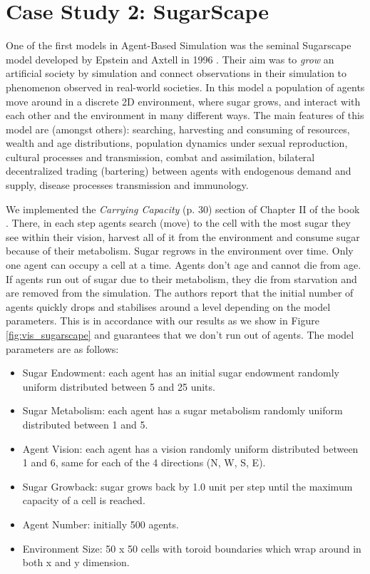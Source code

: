 \section{Case Study 2: SugarScape} %
\label{sec:cs_sugarscape}

One of the first models in Agent-Based Simulation was the seminal Sugarscape model developed by Epstein and Axtell in 1996 \cite{epstein_growing_1996}. Their aim was to \textit{grow} an artificial society by simulation and connect observations in their simulation to phenomenon observed in real-world societies. In this model a population of agents move around in a discrete 2D environment, where sugar grows, and interact with each other and the environment in many different ways. The main features of this model are (amongst others): searching, harvesting and consuming of resources, wealth and age distributions, population dynamics under sexual reproduction, cultural processes and transmission, combat and assimilation, bilateral decentralized trading (bartering) between agents with endogenous demand and supply, disease processes transmission and immunology.

We implemented the \textit{Carrying Capacity} (p. 30) section of Chapter II of the book \cite{epstein_growing_1996}. There, in each step agents search (move) to the cell with the most sugar they see within their vision, harvest all of it from the environment and consume sugar because of their metabolism. Sugar regrows in the environment over time. Only one agent can occupy a cell at a time. Agents don't age and cannot die from age. If agents run out of sugar due to their metabolism, they die from starvation and are removed from the simulation. The authors report that the initial number of agents quickly drops and stabilises around a level depending on the model parameters. This is in accordance with our results as we show in Figure \ref{fig:vis_sugarscape} and guarantees that we don't run out of agents. The model parameters are as follows:

\begin{itemize}
	\item Sugar Endowment: each agent has an initial sugar endowment randomly uniform distributed between 5 and 25 units.
	\item Sugar Metabolism: each agent has a sugar metabolism randomly uniform distributed between 1 and 5.
	\item Agent Vision: each agent has a vision randomly uniform distributed between 1 and 6, same for each of the 4 directions (N, W, S, E). 
	\item Sugar Growback: sugar grows back by 1.0 unit per step until the maximum capacity of a cell is reached.
	\item Agent Number: initially 500 agents.
	\item Environment Size: 50 x 50 cells with toroid boundaries which wrap around in both x and y dimension.
\end{itemize}

